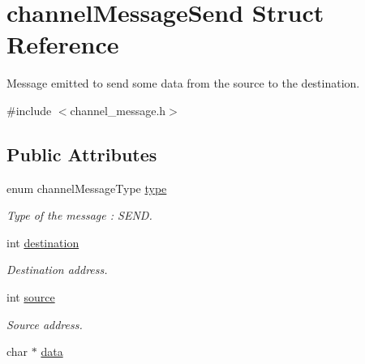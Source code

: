 \hypertarget{structchannelMessageSend}{\section{channel\-Message\-Send Struct Reference}
\label{structchannelMessageSend}
}


Message emitted to send some data from the source to the destination.  




{\ttfamily \#include $<$channel\-\_\-message.\-h$>$}

\subsection*{Public Attributes}
\begin{DoxyCompactItemize}
\item 
\hypertarget{structchannelMessageSend_a1334c6190bd3c077a96d23f862cded10}{enum channel\-Message\-Type \hyperlink{structchannelMessageSend_a1334c6190bd3c077a96d23f862cded10}{type}}\label{structchannelMessageSend_a1334c6190bd3c077a96d23f862cded10}

\begin{DoxyCompactList}\small\item\em Type of the message \-: S\-E\-N\-D. \end{DoxyCompactList}\item 
\hypertarget{structchannelMessageSend_aa1018e2db2a00f3487d2918af53d7544}{int \hyperlink{structchannelMessageSend_aa1018e2db2a00f3487d2918af53d7544}{destination}}\label{structchannelMessageSend_aa1018e2db2a00f3487d2918af53d7544}

\begin{DoxyCompactList}\small\item\em Destination address. \end{DoxyCompactList}\item 
\hypertarget{structchannelMessageSend_ac59ec2b7b44efb45da8ff8866f5f5b34}{int \hyperlink{structchannelMessageSend_ac59ec2b7b44efb45da8ff8866f5f5b34}{source}}\label{structchannelMessageSend_ac59ec2b7b44efb45da8ff8866f5f5b34}

\begin{DoxyCompactList}\small\item\em Source address. \end{DoxyCompactList}\item 
\hypertarget{structchannelMessageSend_a21415fd50659f90e9313e586cf4571b3}{char $\ast$ \hyperlink{structchannelMessageSend_a21415fd50659f90e9313e586cf4571b3}{data}}\label{structchannelMessageSend_a21415fd50659f90e9313e586cf4571b3}


\end{DoxyCompactItemize}
